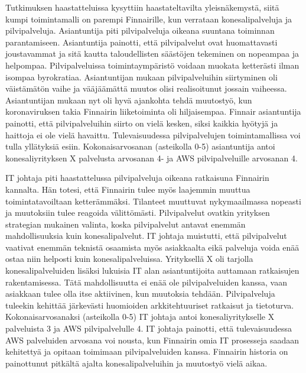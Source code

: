 Tutkimuksen haastatteluissa kysyttiin haastateltavilta yleisnäkemystä, siitä kumpi toimintamalli on parempi Finnairille, kun verrataan konesalipalveluja ja pilvipalveluja. Asiantuntija piti pilvipalveluja oikeana suuntana toiminnan parantamiseen. Asiantuntija painotti, että pilvipalvelut ovat huomattavasti joustavammat ja sitä kautta taloudellisten säästöjen tekeminen on nopeampaa ja helpompaa. Pilvipalveluissa toimintaympäristö voidaan muokata ketterästi ilman isompaa byrokratiaa. Asiantuntijan mukaan pilvipalveluihin siirtyminen oli väistämätön vaihe ja vääjäämättä muutos olisi realisoitunut jossain vaiheessa. Asiantuntijan mukaan nyt oli hyvä ajankohta tehdä muutostyö, kun koronaviruksen takia Finnairin liiketoiminta oli hiljaisempaa. Finnair asiantuntija painotti, että pilvipalveluihin siirto on vielä kesken, siksi kaikkia hyötyjä ja haittoja ei ole vielä havaittu. Tulevaisuudessa pilvipalvelujen toimintamallissa voi tulla yllätyksiä esiin. Kokonaisarvosanan (asteikolla 0-5) asiantuntija antoi konesaliyrityksen X palvelusta arvosanan 4- ja AWS pilvipalveluille arvosanan 4.

IT johtaja piti haastattelussa pilvipalveluja oikeana ratkaisuna Finnairin kannalta. Hän totesi, että Finnairin tulee myös laajemmin muuttua toimintatavoiltaan ketterämmäksi. Tilanteet muuttuvat nykymaailmassa nopeasti ja muutoksiin tulee reagoida välittömästi. Pilvipalvelut ovatkin yrityksen strategian mukainen valinta, koska pilvipalvelut antavat enemmän mahdollisuuksia kuin konesalipalvelut. IT johtaja muistutti, että pilvipalvelut vaativat enemmän teknistä osaamista myös asiakkaalta eikä palveluja voida enää ostaa niin helposti kuin konesalipalveluissa. Yrityksellä X oli tarjolla konesalipalveluiden lisäksi lukuisia IT alan asiantuntijoita auttamaan ratkaisujen rakentamisessa. Tätä mahdollisuutta ei enää ole pilvipalveluiden kanssa, vaan asiakkaan tulee olla itse aktiivinen, kun muutoksia tehdään. Pilvipalveluja tuleekin kehittää järkevästi huomioiden arkkitehtuuriset ratkaisut ja tietoturva. Kokonaisarvosanaksi (asteikolla 0-5) IT johtaja antoi konesaliyritykselle X palveluista 3 ja AWS pilvipalvelulle 4. IT johtaja painotti, että tulevaisuudessa AWS palveluiden arvosana voi nousta, kun Finnairin omia IT prosesseja saadaan kehitettyä ja opitaan toimimaan pilvipalveluiden kanssa. Finnairin historia on painottunut pitkältä ajalta konesalipalveluihin ja muutostyö vielä aikaa.